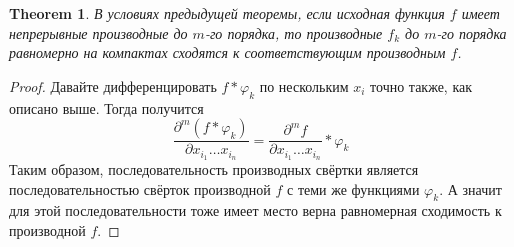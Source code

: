 \documentclass[a4paper,12pt]{article} %
\newtheorem{theorem}{Theorem}
\theoremstyle{definition}
\begin{document}
\begin{theorem}
	В условиях предыдущей теоремы, если исходная функция $f$ имеет непрерывные производные до $m$-го порядка, то производные $f_k$ до $m$-го порядка равномерно на компактах сходятся к соответствующим производным $f$.
\end{theorem}
\begin{proof}
	Давайте дифференцировать $f * \varphi_k$ по нескольким $x_i$ точно также, как описано выше. Тогда получится
	\begin{equation}
		\frac{\partial^m (f * \varphi_k)}{\partial x_{i_1} \dots x_{i_n}} = \frac{\partial^m f}{\partial x_{i_1} \dots x_{i_n}} *  \varphi_k
	\end{equation}
	Таким образом, последовательность производных свёртки является последовательностью свёрток производной $f$ с теми же функциями $\varphi_k$. А значит для этой последовательности тоже имеет место верна равномерная сходимость к производной $f$.
\end{proof}
\end{document}
